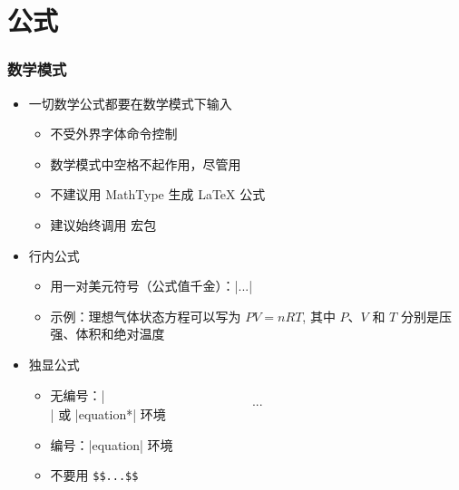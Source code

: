 \section{公式}

\begin{frame}[fragile]
\frametitle{数学模式}
\begin{itemize}
  \item<+-> 一切数学公式都要在数学模式下输入

    \begin{itemize}
      \item 不受外界字体命令控制
      \item 数学模式中空格不起作用，尽管用
      \item \alert{不建议用 MathType 生成 \LaTeX{} 公式}
      \item 建议始终调用  宏包
    \end{itemize}

  \item<+-> 行内公式

    \begin{itemize}
      \item 用一对美元符号（公式值千金）：|$...$|
      \item 示例：理想气体状态方程可以写为 $PV=nRT$, 其中 $P$、$V$ 和 $T$
        分别是压强、体积和绝对温度
    \end{itemize}

  \item<+-> 独显公式

    \begin{itemize}
      \item 无编号：|\[...\]| 或 |equation*| 环境
      \item 编号：|equation| 环境
      \item \alert{不要用 \texttt{\$\$...\$\$}}
    \end{itemize}
\end{itemize}
\end{frame}

